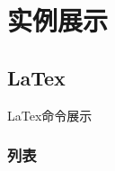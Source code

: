 \documentclass[UTF8]{ctexart}
\begin{document}
\section{实例展示}

  \subsection{LaTex}
  {\color{blue}LaTex命令展示}



\subsubsection{列表}
\end{document}
